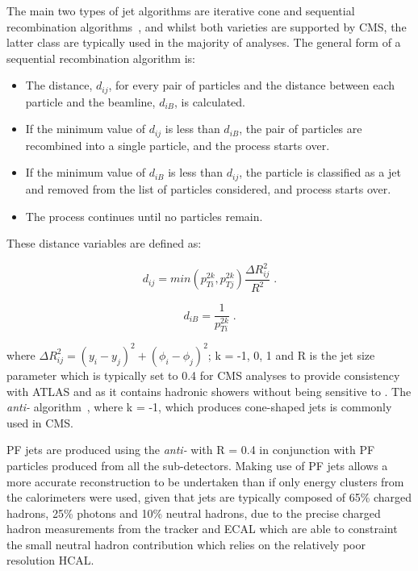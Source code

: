 The main two types of jet algorithms are iterative cone and sequential recombination algorithms~\cite{Salam:2009jx}, and whilst both varieties are supported by CMS, the latter class are typically used in the majority of analyses.
The general form of a sequential recombination algorithm is:
\begin{itemize}
\item The distance, $d_{ij}$, for every pair of particles and the distance between each particle and the beamline, $d_{iB}$, is calculated.
\item If the minimum value of $d_{ij}$ is less than $d_{iB}$, the pair of particles are recombined into a single particle, and the process starts over.
\item If the minimum value of $d_{iB}$ is less than $d_{ij}$, the particle is classified as a jet and removed from the list of particles considered, and process starts over.
\item The process continues until no particles remain.
\end{itemize}

These distance variables are defined as:

\begin{equation}
d_{ij} = min(p^{2k}_{Ti},p^{2k}_{Tj}) \frac{\Delta R^{2}_{ij}}{R^{2}} \;.
\label{eq:jetAlgo1}
\end{equation}

\begin{equation}
d_{iB} = \frac{1}{p^{2k}_{Ti}} \;.
\label{eq:jetAlgo2}
\end{equation}

where $\Delta R^{2}_{ij} = (y_{i} - y_{j})^{2} + (\phi_{i} - \phi_{j})^{2}$; k = -1, 0, 1 and R is the jet size parameter which is typically set to 0.4 for CMS analyses to provide consistency with ATLAS and as it contains hadronic showers without being sensitive to \PU.
The \emph{anti-\kt} algorithm~\cite{Cacciari:2008gp}, where k = -1, which produces cone-shaped jets is commonly used in CMS.

PF jets are produced using the \emph{anti-\kt} with R = 0.4 in conjunction with PF particles produced from all the sub-detectors.
Making use of PF jets allows a more accurate reconstruction to be undertaken than if only energy clusters from the calorimeters were used, given that jets are typically composed of 65\% charged hadrons, 25\% photons and 10\% neutral hadrons, due to the precise charged hadron measurements from the tracker and ECAL which are able to constraint the small neutral hadron contribution which relies on the relatively poor resolution HCAL.

